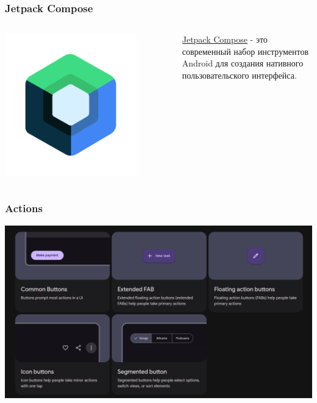 \documentclass[12pt]{beamer}
\begin{document}
    \begin{frame}
        \frametitle{Jetpack Compose}

        \begin{columns}

            \begin{column}{0.5\textwidth}
                \includegraphics[width=0.8\textwidth]{jc.png}
            \end{column}

            \begin{column}{0.5\textwidth}
                \href{https://developer.android.com/compose}{Jetpack Compose}
                - это современный набор инструментов Android
                для создания нативного пользовательского интерфейса.
            \end{column}

        \end{columns}

    \end{frame}

    \begin{frame}
        \frametitle{Actions}
    
        \includegraphics[width=1\textwidth]{actions.png}
    
    \end{frame}
\end{document}
